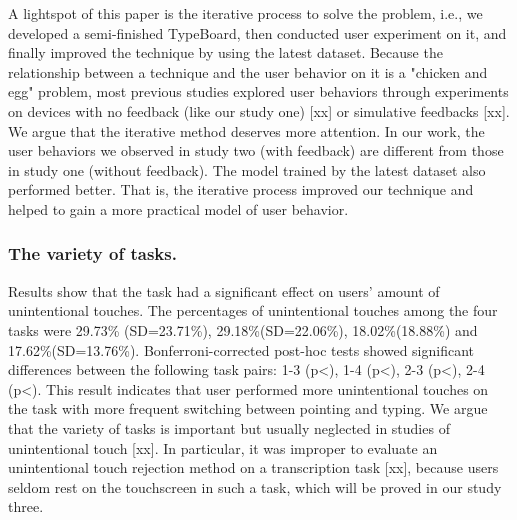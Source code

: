 A lightspot of this paper is the iterative process to solve the problem, i.e., we developed a semi-finished TypeBoard, then conducted user experiment on it, and finally improved the technique by using the latest dataset. Because the relationship between a technique and the user behavior on it is a "chicken and egg" problem, most previous studies explored user behaviors through experiments on devices with no feedback (like our study one) [xx] or simulative feedbacks [xx]. We argue that the iterative method deserves more attention. In our work, the user behaviors we observed in study two (with feedback) are different from those in study one (without feedback). The model trained by the latest dataset also performed better. That is, the iterative process improved our technique and helped to gain a more practical model of user behavior.


\subsubsection{The variety of tasks.}

Results show that the task had a significant effect on users' amount of unintentional touches. The percentages of unintentional touches among the four tasks were 29.73\% (SD=23.71\%), 29.18\%(SD=22.06\%), 18.02\%(18.88\%) and 17.62\%(SD=13.76\%). Bonferroni-corrected post-hoc tests showed significant differences between the following task pairs: 1-3 (p<), 1-4 (p<), 2-3 (p<), 2-4 (p<). This result indicates that user performed more unintentional touches on the task with more frequent switching between pointing and typing. We argue that the variety of tasks is important but usually neglected in studies of unintentional touch [xx]. In particular, it was improper to evaluate an unintentional touch rejection method on a transcription task [xx], because users seldom rest on the touchscreen in such a task, which will be proved in our study three.


